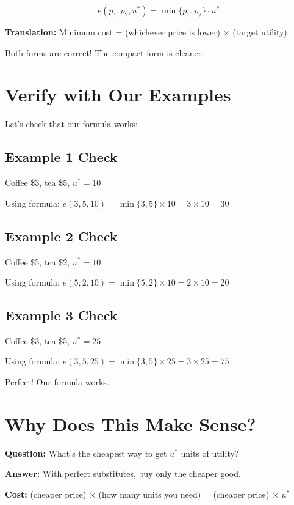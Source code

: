 \documentclass[11pt]{article}
\begin{document}
\begin{tcolorbox}[colback=yellow!10!white,colframe=orange!75!black,title=Answer: Expenditure Function (Compact)]
\begin{equation}
e(p_1, p_2, u^*) = \min\{p_1, p_2\} \cdot u^*
\end{equation}
\end{tcolorbox}

\textbf{Translation:} Minimum cost = (whichever price is lower) $\times$ (target utility)

Both forms are correct! The compact form is cleaner.

\section{Verify with Our Examples}

Let's check that our formula works:

\subsection{Example 1 Check}

Coffee \$3, tea \$5, $u^* = 10$

Using formula: $e(3, 5, 10) = \min\{3, 5\} \times 10 = 3 \times 10 = 30$ \checkmark

\subsection{Example 2 Check}

Coffee \$5, tea \$2, $u^* = 10$

Using formula: $e(5, 2, 10) = \min\{5, 2\} \times 10 = 2 \times 10 = 20$ \checkmark

\subsection{Example 3 Check}

Coffee \$3, tea \$5, $u^* = 25$

Using formula: $e(3, 5, 25) = \min\{3, 5\} \times 25 = 3 \times 25 = 75$ \checkmark

Perfect! Our formula works.

\section{Why Does This Make Sense?}

\begin{tcolorbox}[colback=green!5!white,colframe=green!75!black,title=Intuition]
\textbf{Question:} What's the cheapest way to get $u^*$ units of utility?

\textbf{Answer:} With perfect substitutes, buy only the cheaper good.

\textbf{Cost:} (cheaper price) $\times$ (how many units you need) = (cheaper price) $\times$ $u^*$
\end{tcolorbox}
\end{document}
